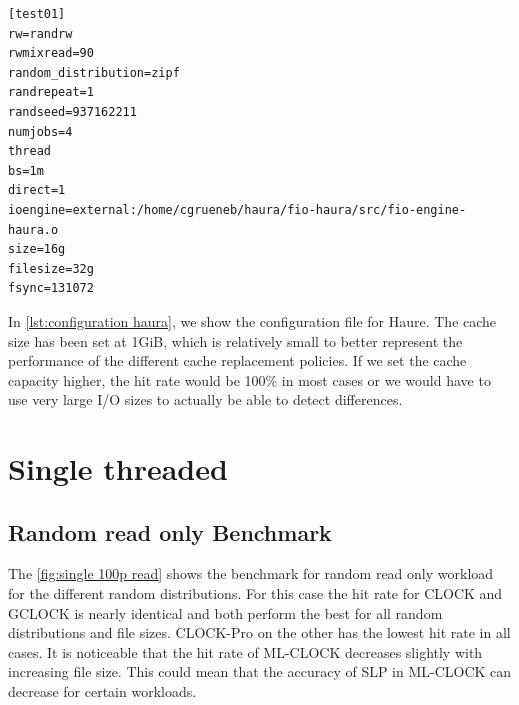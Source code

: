\documentclass[
	12pt,
	a4paper,
	abstract,
	bibliography=totoc,
	chapterprefix,
	headings=openright,
	numbers=endperiod,
	parskip=half,
	twoside,
]{scrreprt}
\begin{document}
\bigskip

\begin{lstlisting}[mathescape=true,caption=example fio jobfile, label=lst:fio jobfile]
[test01]
rw=randrw
rwmixread=90
random_distribution=zipf
randrepeat=1
randseed=937162211
numjobs=4
thread
bs=1m
direct=1
ioengine=external:/home/cgrueneb/haura/fio-haura/src/fio-engine-haura.o
size=16g
filesize=32g
fsync=131072
\end{lstlisting}

In \ref{lst:configuration haura}, we show the configuration file for Haure.
The cache size has been set at 1GiB, which is relatively small to better 
represent the performance of the different cache replacement policies.
If we set the cache capacity higher, the hit rate would be 100\% 
in most cases or we would have to use very large I/O sizes to actually be able to detect differences.


\newpage
\section{Single threaded}
\subsection{Random read only Benchmark}

The \cref{fig:single 100p read} shows the benchmark for random read only workload for the different random distributions.
For this case the hit rate for CLOCK and GCLOCK is nearly identical and both perform the best for all random distributions and file sizes. 
CLOCK-Pro on the other has the lowest hit rate in all cases.
It is noticeable that the hit rate of ML-CLOCK decreases slightly with increasing file size.
This could mean that the accuracy of SLP in ML-CLOCK can decrease for certain workloads.
\end{document}

